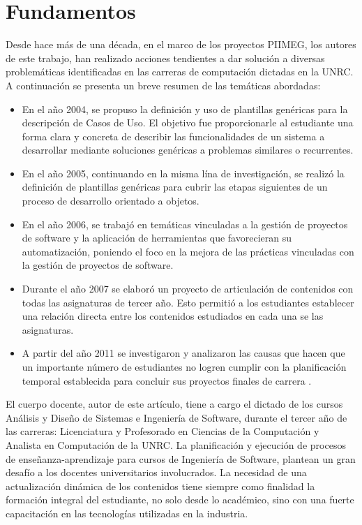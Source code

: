 \section{Fundamentos}\label{fundamenta}
Desde hace más de una década, en el marco de los proyectos PIIMEG\cite{piimeg},
los autores de este trabajo, han realizado acciones tendientes a dar solución a diversas problemáticas identificadas en las carreras de 
computación dictadas en la UNRC. A continuación se presenta un breve resumen de las temáticas abordadas:
\begin{itemize}
 \item En el año 2004, se propuso la definición y uso de plantillas genéricas para la descripción de Casos de Uso. El objetivo fue proporcionarle al estudiante una forma clara y concreta de describir las funcionalidades de un sistema a desarrollar 
mediante soluciones genéricas a problemas similares o recurrentes. 
 \item En el año 2005, continuando en la misma  lína de investigación, se realizó 
la definición de plantillas genéricas para cubrir las etapas siguientes de un proceso de desarrollo orientado a objetos. 
\item En el año 2006, se trabajó en temáticas vinculadas a la gestión de proyectos de software y la aplicación de herramientas que 
favorecieran su automatización, poniendo el foco en la mejora de las prácticas vinculadas con la gestión de proyectos de software.
\item Durante el año 2007 se elaboró un proyecto de articulación de contenidos con todas las asignaturas de tercer año. Esto permitió a los 
estudiantes
establecer una relación directa entre los contenidos estudiados en cada una se las asignaturas.
\item A partir del año 2011 se investigaron y analizaron las causas que hacen que un importante número de estudiantes no logren cumplir con la 
planificación temporal establecida para concluir sus proyectos finales de carrera \cite{chino}.
\end{itemize}
El cuerpo docente, autor de este artículo, tiene a cargo el dictado de los cursos Análisis y Diseño de Sistemas e Ingeniería de Software, durante el tercer año de las carreras: Licenciatura y Profesorado en Ciencias de la Computación y Analista en Computación de la  UNRC.
La planificación y ejecución de procesos de enseñanza-aprendizaje para cursos de Ingeniería de Software, plantean un gran desafío a los docentes universitarios involucrados. La necesidad de una actualización dinámica de los contenidos tiene siempre como finalidad la formación integral del estudiante, no solo desde lo académico, 
sino con una fuerte capacitación en las tecnologías utilizadas en la industria.

  
